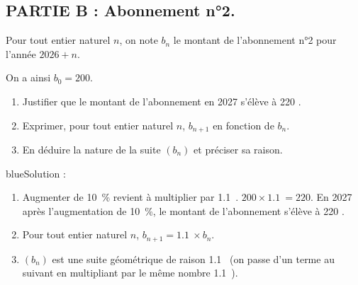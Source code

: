 \documentclass[10pt]{article}
\providecommand{\euro}{\texteuro}
\providecommand{\np}[2][]{{#2~#1}}
\providecommand{\euro}{{\text{€}}}
\renewcommand{\euro}{\ifmmode\text{\texteuro}\else\texteuro\fi}
\begin{document}
\bigskip

\subsection*{PARTIE B : Abonnement n°2.}

Pour tout entier naturel $n$, on note $b_n$ le montant de l'abonnement n°2 pour l'année $2026+n$.

On a ainsi $b_0=200$.
\begin{enumerate}
\item Justifier que le montant de l'abonnement en 2027 s'élève à 220 \euro{}.
\item Exprimer, pour tout entier naturel $n$, $b_{n+1}$ en fonction de $b_n$.
\item En déduire la nature de la suite $(b_n)$ et préciser sa raison.
\end{enumerate}

\begin{color}{blue}Solution :\par
\begin{enumerate}
\item Augmenter de 10~\% revient à multiplier par \np{1.1}. $200\times \np{1.1} = 220$. En 2027 après l'augmentation de 10~\%, le montant de l'abonnement s'élève à 220 \euro{}.
\item Pour tout entier naturel $n$, $b_{n+1} = \np{1.1}\times b_n$.
\item $(b_n)$ est une suite géométrique de raison \np{1.1} (on passe d'un terme au suivant en multipliant par le même nombre \np{1.1}).
\end{enumerate}
\end{color}

\bigskip
\end{document}
